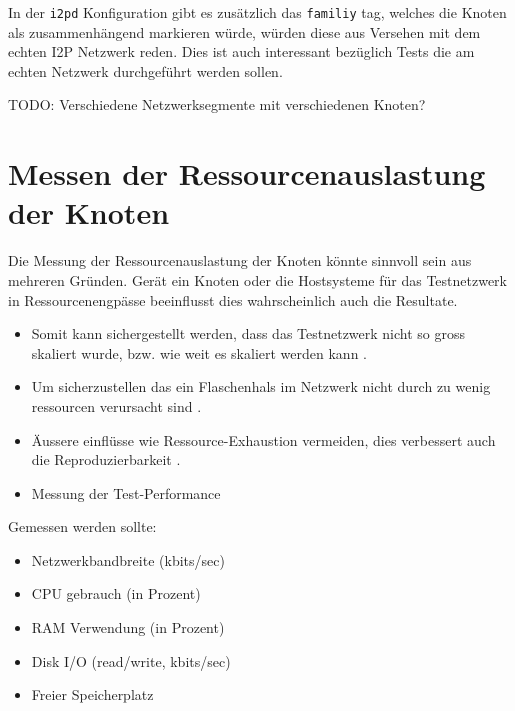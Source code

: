 In der \lstinline|i2pd| Konfiguration gibt es zusätzlich das \lstinline|familiy| tag, welches die Knoten als zusammenhängend markieren würde, würden diese aus Versehen mit dem echten I2P Netzwerk reden. Dies ist auch interessant bezüglich Tests die am echten Netzwerk durchgeführt werden sollen.

TODO: Verschiedene Netzwerksegmente mit verschiedenen Knoten?

\section{Messen der Ressourcenauslastung der Knoten}

Die Messung der Ressourcenauslastung der Knoten könnte sinnvoll sein aus mehreren Gründen.
Gerät ein Knoten oder die Hostsysteme für das Testnetzwerk in Ressourcenengpässe beeinflusst dies wahrscheinlich auch die Resultate.

\begin{itemize}
    \item Somit kann sichergestellt werden, dass das Testnetzwerk nicht so gross skaliert wurde, bzw. wie weit es skaliert werden kann .
    \item Um sicherzustellen das ein Flaschenhals im Netzwerk nicht durch zu wenig ressourcen verursacht sind .
    \item Äussere einflüsse wie Ressource-Exhaustion vermeiden, dies verbessert auch die Reproduzierbarkeit .
    \item Messung der Test-Performance
\end{itemize}

Gemessen werden sollte:

\begin{itemize}
    \item Netzwerkbandbreite (kbits/sec)
    \item CPU gebrauch (in Prozent)
    \item RAM Verwendung (in Prozent)
    \item Disk I/O (read/write, kbits/sec)
    \item Freier Speicherplatz
\end{itemize}
